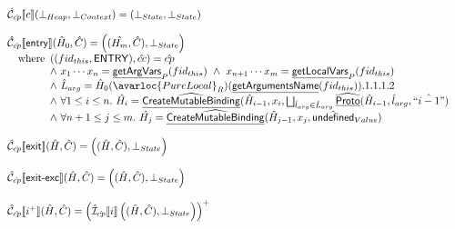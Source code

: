 \[
\begin{array}{l} 
\aN_{\acp}\lbr c \rbr (\bot_{Heap},\bot_{Context})
 = (\bot_{State},\bot_{State})\\\\

\aN _{\acp}\lbr {\sf entry} \rbr (\hat{H}_0,\hat{C}) =
 \left((\hat{H_m},\hat{C}), \bot_{State}\right)\\
 \quad\wherec{
   (({fid_{this}},\SF{ENTRY}),\hat{cc}) = \acp \\
   \land\ x_1 \cdots x_n = \chf{getArgVars}_P(fid_{this})\ 
   \land\ x_{n+1} \cdots x_m = \chf{getLocalVars}_P(fid_{this}) \\
   \land\ \hat{L}_{arg} = \hat{H}_0(\avarloc{PureLocal}_R)(\chf{getArgumentsName}(fid_{this})).1.1.1.2 \\
   \land\ \forall 1 \leq i \leq n.\ \hat{H_i}= \ahf{CreateMutableBinding}(\hat{H}_{i-1}, x_i, 
     \bigsqcup_{\hat{l}_{arg}\in\hat{L}_{arg}}\ahf{Proto}(\hat{H}_{i-1},\hat{l}_{arg},\hat{``i-1"}) \\
   \land\ \forall n+1 \leq j \leq m.\ \hat{H_j}= \ahf{CreateMutableBinding}(\hat{H}_{j-1}, x_j, \aundef_{Value})
}\\
\\

\aN_{\acp}\lbr \SF{exit} \rbr (\hat{H},\hat{C}) = \left((\hat{H},\hat{C}),\bot_{State}\right) \\
\\
\aN_{\acp}\lbr \SF{exit-exc} \rbr (\hat{H},\hat{C}) = \left((\hat{H},\hat{C}),\bot_{State}\right) \\
\\

\aN_{\acp}\lbr i^+\rbr (\hat{H},\hat{C}) =
  \left(\aI _{\acp} \lbr i\rbr\left((\hat{H},\hat{C}),\bot_{State}\right)\right)^{+} \\\\



\end{array}\]
